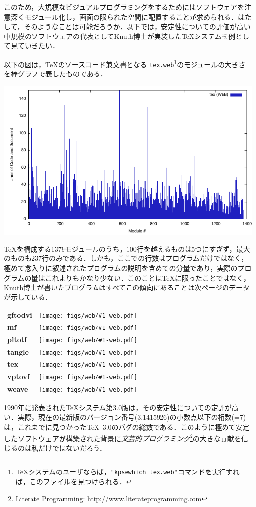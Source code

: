 \documentclass [11pt] {jsarticle}
\begin{document}
このため，大規模なビジュアルプログラミングをするためにはソフトウェアを注意深くモジュール化し，画面の限られた空間に配置することが求められる．はたして，そのようなことは可能だろうか．以下では，安定性についての評価が高い中規模のソフトウェアの代表としてKnuth博士が実装した\TeX{}システムを例として見ていきたい．

以下の図は，\TeX のソースコード兼文書となる \texttt {tex.web}\footnote {\TeX{}システムのユーザならば，\texttt {"kpsewhich tex.web"}コマンドを実行すれば，このファイルを見つけられる．}のモジュールの大きさを棒グラフで表したものである．

\centerline {\includegraphics [width=.80\linewidth]{figs/web/tex-web.pdf}}

\TeX を構成する1379モジュールのうち，100行を越えるものは5つにすぎず，最大のものも237行のみである．しかも，ここでの行数はプログラムだけではなく，極めて念入りに叙述されたプログラムの説明を含めての分量であり，実際のプログラムの量はこれよりもかなり少ない．このことは\TeX に限ったことではなく，Knuth博士が書いたプログラムはすべてこの傾向にあることは次ページのデータが示している．

\newcommand\webfile[1]{\textbf {#1} &
  \texttt{[image: figs/web/\#1-web.pdf]}}

\begin {tabular}{ll}
  \webfile {gftodvi} \\
  \webfile {mf} \\
  \webfile {pltotf} \\
  \webfile {tangle} \\
  \webfile {tex} \\
  \webfile {vptovf} \\
  \webfile {weave}
\end {tabular}
\bigskip

1990年に発表された\TeX システム第3.0版は，その安定性についての定評が高い．実際，現在の最新版のバージョン番号(3.1415926)の小数点以下の桁数(=7)は，これまでに見つかった\TeX~3.0のバグの総数である．このように極めて安定したソフトウェアが構築された背景に\emph {文芸的プログラミング}\cite {Knuth92Literate-programming}\footnote {Literate Programming: \url {http://www.literateprogramming.com}}の大きな貢献を信じるのは私だけではないだろう．
\end{document}
